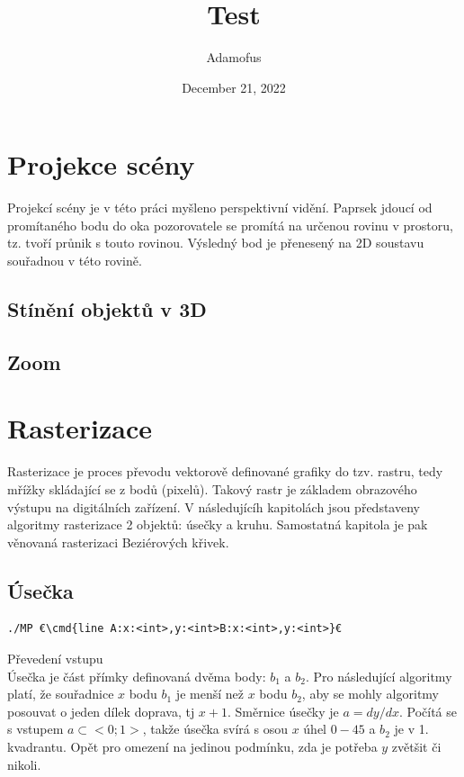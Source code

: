 \documentclass[a4paper,12pt]{book}
\newcommand{\cmd}[1]{\textcolor{blue}{\textbf{#1}}}
\begin{document}
\title{\Large{\textbf{Test}}}
\author{Adamofus}
\date{December 21, 2022}
\maketitle
\let\cleardoublepage\clearpage
\tableofcontents

	
\setcounter{page}{2}



\chapter{Projekce scény}
Projekcí scény je v této práci myšleno perspektivní vidění.
Paprsek jdoucí od promítaného bodu do oka pozorovatele se promítá na určenou rovinu v prostoru, tz. tvoří průnik s touto rovinou. Výsledný bod je přenesený na 2D soustavu souřadnou v této rovině.



\section{Stínění objektů v 3D}
\section{Zoom}




\chapter{Rasterizace}


Rasterizace je proces převodu vektorově definované grafiky do tzv. rastru, tedy mřížky skládající se z bodů (pixelů).
Takový rastr je základem obrazového výstupu na digitálních zařízení.
V následujícíh kapitolách jsou představeny algoritmy rasterizace 2 objektů: úsečky a kruhu.
Samostatná kapitola je pak věnovaná rasterizaci Beziérových křivek.


\section{Úsečka}


\begin{lstlisting}
./MP €\cmd{line A:x:<int>,y:<int>B:x:<int>,y:<int>}€
\end{lstlisting}

Převedení vstupu\\
Úsečka je část přímky definovaná dvěma body: $b_1$ a $b_2$.
Pro následující algoritmy platí, že souřadnice $x$ bodu $b_1$ je menší než $x$ bodu $b_2$, aby se mohly algoritmy posouvat o jeden dílek doprava, tj $x+1$.
Směrnice úsečky je $a = dy/dx$. 
Počítá se s vstupem $a\subset<0;1>$, takže úsečka svírá s osou $x$ úhel $0-45$ a $b_2$ je v 1. kvadrantu. Opět pro omezení na jedinou podmínku, zda je potřeba $y$ zvětšit či nikoli.
\end{document}

